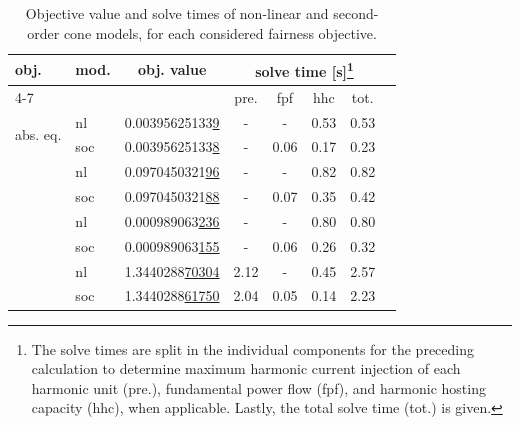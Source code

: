 \begin{table}[b!]
    \centering
    \caption{Objective value and solve times of non-linear and second- order cone models, for each considered fairness objective.}
    \label{tab:equivalence}
    \begin{tabular}{l l | c c c c c c}
    obj.                        & mod.      & obj. value                    & \multicolumn{4}{c}{solve time [s]\footnote{The solve times are split in the individual components for the preceding calculation to determine maximum harmonic current injection of each harmonic unit (pre.), fundamental power flow (fpf), and harmonic hosting capacity (hhc), when applicable. Lastly, the total solve time (tot.) is given.}}    \\ \cline{4-7}
                                &           &                               & pre.  & fpf   & hhc   & tot.          \\ \hline
    \multirow{2}{*}{abs. eq.}   & nl        & 0.00395625133\underline{9}    & -     & -     & 0.53  & 0.53          \\
                                & soc       & 0.00395625133\underline{8}    & -     & 0.06  & 0.17  & 0.23          \\ \arrayrulecolor{gray!20} \hline
    \multirow{2}{*}{max. eff.}  & nl        & 0.0970450321\underline{96}    & -     & -     & 0.82 & 0.82         \\
                                & soc       & 0.0970450321\underline{88}    & -     & 0.07 & 0.35 & 0.42         \\ \arrayrulecolor{gray!20} \hline
    \multirow{2}{*}{maximin}    & nl        & 0.000989063\underline{236}    & -     & -     & 0.80 & 0.80         \\
                                & soc       & 0.000989063\underline{155}    & -     & 0.06 & 0.26 & 0.32         \\ \arrayrulecolor{gray!20} \hline
    \multirow{2}{*}{KS barg.}   & nl        & 1.3440288\underline{70304}    & 2.12 & -     & 0.45 & 2.57         \\
                                & soc       & 1.3440288\underline{61750}    & 2.04 & 0.05 & 0.14 & 2.23         \\
    \end{tabular}
\end{table}

